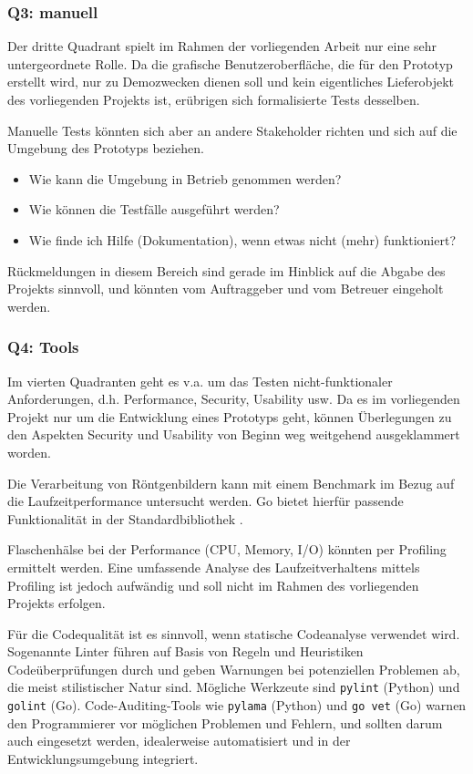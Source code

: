 \subsubsection{Q3: manuell}

Der dritte Quadrant spielt im Rahmen der vorliegenden Arbeit nur eine sehr untergeordnete Rolle. Da die grafische Benutzeroberfläche, die für den Prototyp erstellt wird, nur zu Demozwecken dienen soll und kein eigentliches Lieferobjekt des vorliegenden Projekts ist, erübrigen sich formalisierte Tests desselben.

Manuelle Tests könnten sich aber an andere Stakeholder richten und sich auf die Umgebung des Prototyps beziehen.

\begin{itemize}
    \item Wie kann die Umgebung in Betrieb genommen werden?
    \item Wie können die Testfälle ausgeführt werden?
    \item Wie finde ich Hilfe (Dokumentation), wenn etwas nicht (mehr) funktioniert?
\end{itemize}

Rückmeldungen in diesem Bereich sind gerade im Hinblick auf die Abgabe des Projekts sinnvoll, und könnten vom Auftraggeber und vom Betreuer eingeholt werden.

\subsubsection{Q4: Tools}

Im vierten Quadranten geht es v.a. um das Testen nicht-funktionaler Anforderungen, d.h. Performance, Security, Usability usw. Da es im vorliegenden Projekt nur um die Entwicklung eines Prototyps geht, können Überlegungen zu den Aspekten Security und Usability von Beginn weg weitgehend ausgeklammert worden.

Die Verarbeitung von Röntgenbildern kann mit einem Benchmark im Bezug auf die Laufzeitperformance untersucht werden. Go bietet hierfür passende Funktionalität in der Standardbibliothek \cite[Kapitel 11.4]{gopl}.

Flaschenhälse bei der Performance (CPU, Memory, I/O) könnten per Profiling ermittelt werden. Eine umfassende Analyse des Laufzeitverhaltens mittels Profiling ist jedoch aufwändig und soll nicht im Rahmen des vorliegenden Projekts erfolgen.

Für die Codequalität ist es sinnvoll, wenn statische Codeanalyse verwendet wird. Sogenannte Linter führen auf Basis von Regeln und Heuristiken Codeüberprüfungen durch und geben Warnungen bei potenziellen Problemen ab, die meist stilistischer Natur sind. Mögliche Werkzeute sind \texttt{pylint} (Python) und \texttt{golint} (Go). Code-Auditing-Tools wie \texttt{py\-lama} (Python) und \texttt{go vet} (Go) warnen den Programmierer vor möglichen Problemen und Fehlern, und sollten darum auch eingesetzt werden, idealerweise automatisiert und in der Entwicklungsumgebung integriert.


